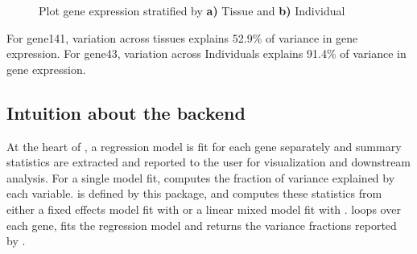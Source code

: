 \documentclass[12pt]{article}\usepackage[]{graphicx}\usepackage[]{xcolor}
\begin{document}
\begin{figure}[h]
\centering
{}\quad
{}
\caption{ Plot gene expression stratified by {\bf a)} Tissue and {\bf b)} Individual}
\label{fig:Stratify}
\end{figure}

For gene141, variation across tissues explains 52.9\% of variance in gene expression.
For gene43, variation across Individuals explains 91.4\% of variance in gene expression.  


\subsection{Intuition about the backend}

At the heart of , a regression model is fit for each gene separately and summary statistics are extracted and reported to the user for visualization and downstream analysis.  For a single model fit,  computes the fraction of variance explained by each variable.   is defined by this package, and computes these statistics from either a fixed effects model fit with  or a linear mixed model fit with .   loops over each gene, fits the regression model and returns the variance fractions reported by .
\end{document}
